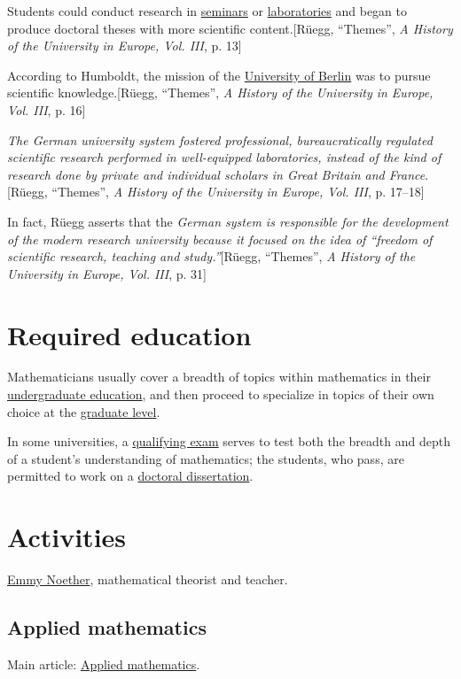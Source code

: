 \documentclass{book}
\numberwithin{equation}{section}
\begin{document}
Students could conduct research in \href{https://en.wikipedia.org/wiki/Seminars}{seminars} or \href{https://en.wikipedia.org/wiki/Laboratories}{laboratories} and began to produce doctoral theses with more scientific content.[Rüegg, ``Themes'', \textit{A History of the University in Europe, Vol. III}, p. 13]

According to Humboldt, the mission of the \href{https://en.wikipedia.org/wiki/University_of_Berlin}{University of Berlin} was to pursue scientific knowledge.[Rüegg, ``Themes'', \textit{A History of the University in Europe, Vol. III}, p. 16]

\textit{The German university system fostered professional, bureaucratically regulated scientific research performed in well-equipped laboratories, instead of the kind of research done by private and individual scholars in Great Britain and France}.[Rüegg, ``Themes'', \textit{A History of the University in Europe, Vol. III}, p. 17--18]

In fact, Rüegg asserts that the \textit{German system is responsible for the development of the modern research university because it focused on the idea of ``freedom of scientific research, teaching and study.''}[Rüegg, ``Themes'', \textit{A History of the University in Europe, Vol. III}, p. 31]

\section{Required education}
Mathematicians usually cover a breadth of topics within mathematics in their \href{https://en.wikipedia.org/wiki/Undergraduate_education}{undergraduate education}, and then proceed to specialize in topics of their own choice at the \href{https://en.wikipedia.org/wiki/Graduate-level}{graduate level}.

In some universities, a \href{https://en.wikipedia.org/wiki/Qualifying_exam}{qualifying exam} serves to test both the breadth and depth of a student's understanding of mathematics; the students, who pass, are permitted to work on a \href{https://en.wikipedia.org/wiki/Doctoral_dissertation}{doctoral dissertation}.

\section{Activities}
\textsf{\href{https://en.wikipedia.org/wiki/Emmy_Noether}{Emmy Noether}, mathematical theorist and teacher.}

\subsection{Applied mathematics}
Main article: \href{https://en.wikipedia.org/wiki/Applied_mathematics}{Applied mathematics}.
\end{document}
